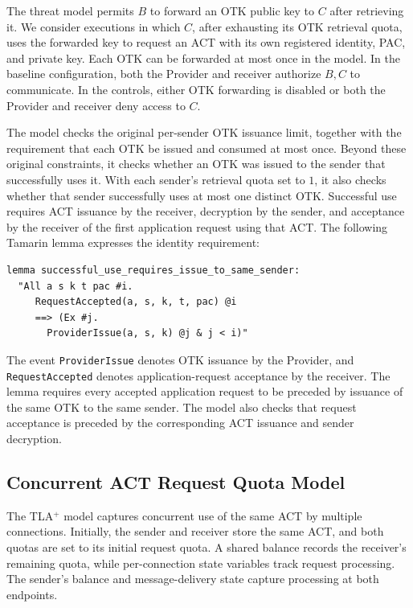 The threat model permits $B$ to forward an OTK public key to $C$ after retrieving it. We consider executions in which $C$, after exhausting its OTK retrieval quota, uses the forwarded key to request an ACT with its own registered identity, PAC, and private key. Each OTK can be forwarded at most once in the model. In the baseline configuration, both the Provider and receiver authorize $B,C$ to communicate. In the controls, either OTK forwarding is disabled or both the Provider and receiver deny access to $C$.

The model checks the original per-sender OTK issuance limit, together with the requirement that each OTK be issued and consumed at most once. Beyond these original constraints, it checks whether an OTK was issued to the sender that successfully uses it. With each sender's retrieval quota set to $1$, it also checks whether that sender successfully uses at most one distinct OTK. Successful use requires ACT issuance by the receiver, decryption by the sender, and acceptance by the receiver of the first application request using that ACT. The following Tamarin lemma expresses the identity requirement:

\begingroup
\renewcommand{\verbatimsize}{\footnotesize}
\setlength{\verbatimbaselineskip}{10pt}
\noindent\begin{minipage}{\linewidth}
\begin{verbatim}
lemma successful_use_requires_issue_to_same_sender:
  "All a s k t pac #i.
     RequestAccepted(a, s, k, t, pac) @i
     ==> (Ex #j.
       ProviderIssue(a, s, k) @j & j < i)"
\end{verbatim}
\end{minipage}
\endgroup

The event \texttt{ProviderIssue} denotes OTK issuance by the Provider, and \texttt{RequestAccepted} denotes application-request acceptance by the receiver. The lemma requires every accepted application request to be preceded by issuance of the same OTK to the same sender. The model also checks that request acceptance is preceded by the corresponding ACT issuance and sender decryption.

\subsection{Concurrent ACT Request Quota Model}
\label{subsec:act-quota-model}

The TLA$^{+}$ model captures concurrent use of the same ACT by multiple connections. Initially, the sender and receiver store the same ACT, and both quotas are set to its initial request quota. A shared balance records the receiver's remaining quota, while per-connection state variables track request processing. The sender's balance and message-delivery state capture processing at both endpoints.

